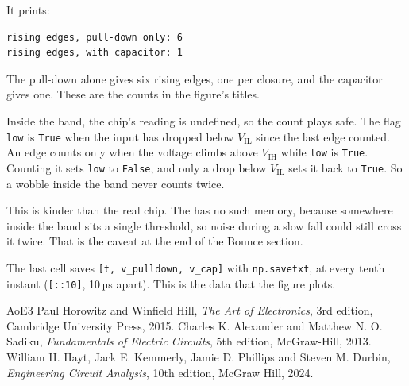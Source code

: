 \documentclass[11pt,a4paper]{article}
\begin{document}
It prints:

\begin{verbatim}
rising edges, pull-down only: 6
rising edges, with capacitor: 1
\end{verbatim}

The pull-down alone gives six rising edges, one per closure, and the capacitor gives one. These are the counts in the figure’s titles.

Inside the band, the chip’s reading is undefined, so the count plays safe. The flag \texttt{low} is \texttt{True} when the input has dropped below $V_\mathrm{IL}$ since the last edge counted. An edge counts only when the voltage climbs above $V_\mathrm{IH}$ while \texttt{low} is \texttt{True}. Counting it sets \texttt{low} to \texttt{False}, and only a drop below $V_\mathrm{IL}$ sets it back to \texttt{True}. So a wobble inside the band never counts twice.

This is kinder than the real chip. The  has no such memory, because somewhere inside the band sits a single threshold, so noise during a slow fall could still cross it twice. That is the caveat at the end of the Bounce section.

The last cell saves \texttt{[t, v\_pulldown, v\_cap]} with \texttt{np.savetxt}, at every tenth instant (\texttt{[::10]}, 10\,µs apart). This is the data that the figure plots.

\begin{thebibliography}{AoE3}
 Paul Horowitz and Winfield Hill, \textit{The Art of Electronics}, 3rd edition, Cambridge University Press, 2015.
 Charles K. Alexander and Matthew N. O. Sadiku, \textit{Fundamentals of Electric Circuits}, 5th edition, McGraw-Hill, 2013.
 William H. Hayt, Jack E. Kemmerly, Jamie D. Phillips and Steven M. Durbin, \textit{Engineering Circuit Analysis}, 10th edition, McGraw Hill, 2024.
\end{thebibliography}

\revisiontable
\end{document}
